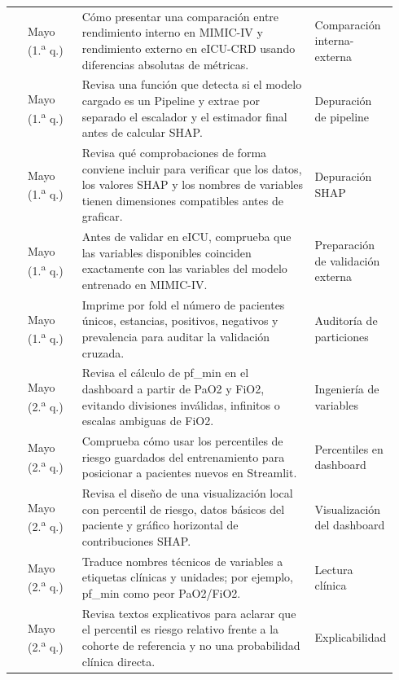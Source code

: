 \documentclass[
  spanish,
  a4paper,
  12pt,
  twoside]{memoir}
\begin{document}
{\begin{longtable*}{@{} p{0.04\linewidth} p{0.14\linewidth} p{0.60\linewidth} p{0.16\linewidth} @{}}
 & Mayo (1.\textsuperscript{a} q.) & Cómo presentar una comparación entre rendimiento interno en MIMIC-IV y rendimiento externo en eICU-CRD usando diferencias absolutas de métricas. & Comparación interna-externa \\
 & Mayo (1.\textsuperscript{a} q.) & Revisa una función que detecta si el modelo cargado es un Pipeline y extrae por separado el escalador y el estimador final antes de calcular SHAP. & Depuración de pipeline \\
 & Mayo (1.\textsuperscript{a} q.) & Revisa qué comprobaciones de forma conviene incluir para verificar que los datos, los valores SHAP y los nombres de variables tienen dimensiones compatibles antes de graficar. & Depuración SHAP \\
 & Mayo (1.\textsuperscript{a} q.) & Antes de validar en eICU, comprueba que las variables disponibles coinciden exactamente con las variables del modelo entrenado en MIMIC-IV. & Preparación de validación externa \\
 & Mayo (1.\textsuperscript{a} q.) & Imprime por fold el número de pacientes únicos, estancias, positivos, negativos y prevalencia para auditar la validación cruzada. & Auditoría de particiones \\
 & Mayo (2.\textsuperscript{a} q.) & Revisa el cálculo de pf\_min en el dashboard a partir de PaO2 y FiO2, evitando divisiones inválidas, infinitos o escalas ambiguas de FiO2. & Ingeniería de variables \\
 & Mayo (2.\textsuperscript{a} q.) & Comprueba cómo usar los percentiles de riesgo guardados del entrenamiento para posicionar a pacientes nuevos en Streamlit. & Percentiles en dashboard \\
 & Mayo (2.\textsuperscript{a} q.) & Revisa el diseño de una visualización local con percentil de riesgo, datos básicos del paciente y gráfico horizontal de contribuciones SHAP. & Visualización del dashboard \\
 & Mayo (2.\textsuperscript{a} q.) & Traduce nombres técnicos de variables a etiquetas clínicas y unidades; por ejemplo, pf\_min como peor PaO2/FiO2. & Lectura clínica \\
 & Mayo (2.\textsuperscript{a} q.) & Revisa textos explicativos para aclarar que el percentil es riesgo relativo frente a la cohorte de referencia y no una probabilidad clínica directa. & Explicabilidad \\

\end{longtable*}}
\end{document}
